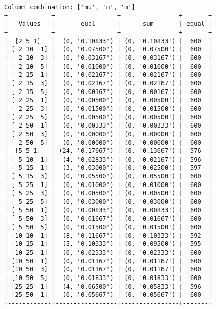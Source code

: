 \documentclass{article}
\begin{document}
\begin{verbatim}
Column combination: ['mu', 'n', 'm']
+------------+-----------------+----------------+-------+
|   Values   |       eucl      |      sum       | equal |
+------------+-----------------+----------------+-------+
|  [2 5 1]   |  (0, '0.10833') | (0, '0.10833') |  600  |
| [ 2 10  1] |  (0, '0.07500') | (0, '0.07500') |  600  |
| [ 2 10  3] |  (0, '0.03167') | (0, '0.03167') |  600  |
| [ 2 10  5] |  (0, '0.01000') | (0, '0.01000') |  600  |
| [ 2 15  1] |  (0, '0.02167') | (0, '0.02167') |  600  |
| [ 2 15  3] |  (0, '0.02167') | (0, '0.02167') |  600  |
| [ 2 15  5] |  (0, '0.00167') | (0, '0.00167') |  600  |
| [ 2 25  1] |  (0, '0.00500') | (0, '0.00500') |  600  |
| [ 2 25  3] |  (0, '0.01500') | (0, '0.01500') |  600  |
| [ 2 25  5] |  (0, '0.00500') | (0, '0.00500') |  600  |
| [ 2 50  1] |  (0, '0.00333') | (0, '0.00333') |  600  |
| [ 2 50  3] |  (0, '0.00000') | (0, '0.00000') |  600  |
| [ 2 50  5] |  (0, '0.00000') | (0, '0.00000') |  600  |
|  [5 5 1]   | (24, '0.17667') | (0, '0.13667') |  576  |
| [ 5 10  1] |  (4, '0.02833') | (0, '0.02167') |  596  |
| [ 5 15  1] |  (3, '0.03000') | (0, '0.02500') |  597  |
| [ 5 15  3] |  (0, '0.05500') | (0, '0.05500') |  600  |
| [ 5 25  1] |  (0, '0.01000') | (0, '0.01000') |  600  |
| [ 5 25  3] |  (0, '0.00500') | (0, '0.00500') |  600  |
| [ 5 25  5] |  (0, '0.03000') | (0, '0.03000') |  600  |
| [ 5 50  1] |  (0, '0.00833') | (0, '0.00833') |  600  |
| [ 5 50  3] |  (0, '0.01667') | (0, '0.01667') |  600  |
| [ 5 50  5] |  (0, '0.01500') | (0, '0.01500') |  600  |
| [10 10  1] |  (8, '0.11667') | (0, '0.10333') |  592  |
| [10 15  1] |  (5, '0.10333') | (0, '0.09500') |  595  |
| [10 25  1] |  (0, '0.02333') | (0, '0.02333') |  600  |
| [10 50  1] |  (0, '0.01167') | (0, '0.01167') |  600  |
| [10 50  3] |  (0, '0.01167') | (0, '0.01167') |  600  |
| [10 50  5] |  (0, '0.01833') | (0, '0.01833') |  600  |
| [25 25  1] |  (4, '0.06500') | (0, '0.05833') |  596  |
| [25 50  1] |  (0, '0.05667') | (0, '0.05667') |  600  |
+------------+-----------------+----------------+-------+
\end{verbatim}
\end{document}
